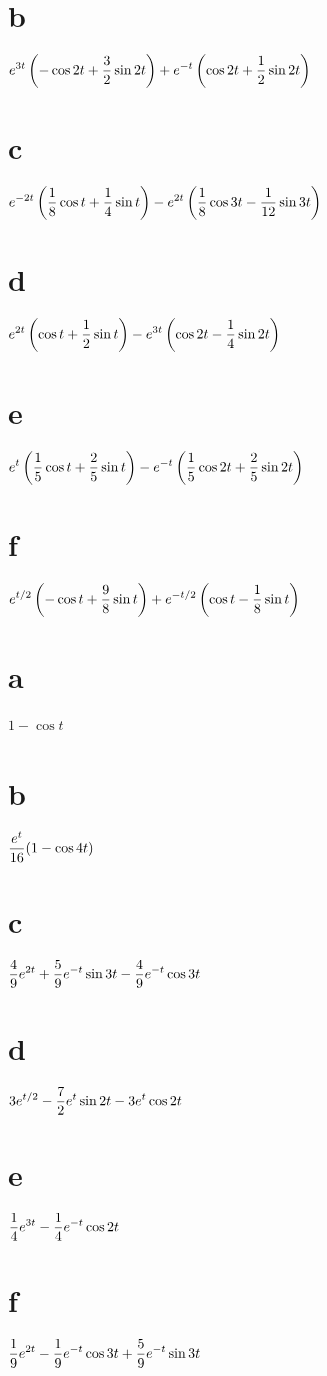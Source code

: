\part{b} $\displaystyle{e^{3t}\left(-\cos 2t+\frac{3}{2}\sin
2t\right)+e^{-t}\left(\cos 2t+\frac{1}{2}\sin 2t\right)}$
 \part{c} $\displaystyle{e^{-2t}\left(\frac{1}{8}\cos t+\frac{1}{4}\sin t\right)-e^{2t}\left(\frac{1}{8}\cos 3t-\frac{1}{12}\sin
3t\right)}$\;
\part{d} $\displaystyle{e^{2t}\left(\cos t+\frac{1}{2}\sin
t\right)-e^{3t}\left(\cos 2t-\frac{1}{4}\sin 2t\right)}$
 \part{e} $\displaystyle{e^t\left(\frac{1}{5}\cos t+\frac{2}{5}
\sin t\right)
-e^{-t}\left(\frac{1}{5}\cos 2t+\frac{2}{5}\sin 2t\right)}$\;
 \part{f} $\displaystyle{e^{t/2}\left(-\cos t+\frac{9}{8}\sin
t\right)+e^{-t/2}\left(\cos t-\frac{1}{8}\sin t\right)}$

 \part{a} $1-\cos t$\;
\part{b} $\displaystyle{\frac{e^t}{16}(1-\cos 4t)}$\;
 \part{c} $\displaystyle{\frac{4}{9}e^{2t}+\frac{5}{9}e^{-t}
\sin 3t-\frac{4}{9}e^{-t}\cos 3t}$
\part{d} $\displaystyle{3e^{t/2}-\frac{7}{2}e^t\sin 2t-3e^t\cos 2t}$
 \part{e} $\displaystyle{\frac{1}{4}e^{3t}-\frac{1}{4}e^{-t}\cos
2t}$\;
\part{f} $\displaystyle{\frac{1}{9}e^{2t}-\frac{1}{9}e^{-t}\cos 3t+\frac{5}{9}e^{-t}\sin 3t}$

